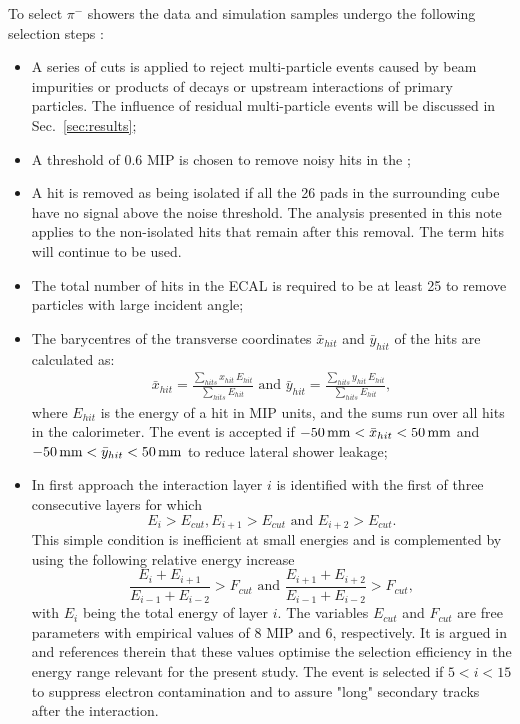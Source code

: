 To select $\pi^-$ showers the data and simulation samples undergo the following selection steps \cite{Bilki:2014uep}\cite{bib:Doublet}: 
\begin{itemize}
	\item A series of cuts is applied to reject multi-particle events caused by beam impurities or products of decays or upstream interactions of primary particles. The influence of residual multi-particle events will be discussed in Sec.~\ref{sec:results};
	\item A threshold of 0.6 MIP is chosen to remove noisy hits in the \ecal;
	\item A hit is removed as being isolated if all the 26 pads in the surrounding cube have no signal above the noise threshold. The analysis presented in this note applies to the non-isolated hits that remain after this removal. The term hits will continue to be used.   
	\item The total number of hits in the ECAL is required to be at least 25 to remove particles with large incident angle;
	\item The barycentres of the transverse coordinates $\bar{x}_{hit}$ and $\bar{y}_{hit}$ of the hits are calculated as:
	\begin{eqnarray}
	\label{eq:barycentre}
	\bar{x}_{hit} = \frac{\displaystyle \sum_{hits} x_{hit}\,E_{hit}}{\displaystyle \sum_{hits} E_{hit}} 
	\text{ and }
	\bar{y}_{hit} = \frac{\displaystyle \sum_{hits} y_{hit}\,E_{hit}}{\displaystyle \sum_{hits} E_{hit}},
	\end{eqnarray}
	where $E_{hit}$ is the energy of a hit in MIP units, and the sums run over all hits in the calorimeter.
	The event is accepted if $-50\,{\rm mm} < \bar{x}_{hit} < 50\,{\rm mm}$ and $-50\,{\rm mm} < \bar{y}_{hit} < 50\,{\rm mm}$ to
	reduce lateral shower leakage;
	\item  In first approach the interaction layer $i$ is identified with the first of three consecutive layers for which
	\begin{equation}
	E_i > E_{cut}, E_{i+1} > E_{cut}  \text{ and } E_{i+2} > E_{cut}.
	\end{equation}
	This simple condition is inefficient at small energies and is complemented by using the following relative energy increase
	\begin{equation}
	\frac{E_i+E_{i+1}}{E_{i-1} + E_{i-2}} > F_{cut} \text{ and } 
	\frac{E_{i+1}+E_{i+2}}{E_{i-1} + E_{i-2}} > F_{cut}, 
	\end{equation}
	with $E_i$ being the total energy of layer $i$. The variables $E_{cut}$ and $F_{cut}$ are free parameters with empirical values of 8 MIP and 6, respectively. It is argued in \cite{Bilki:2014uep} and references therein that these values optimise the selection efficiency in the energy range relevant for the present study.
	The event is selected if $5 < i < 15$ to suppress electron contamination and to assure "long" secondary tracks after the interaction.
\end{itemize}
